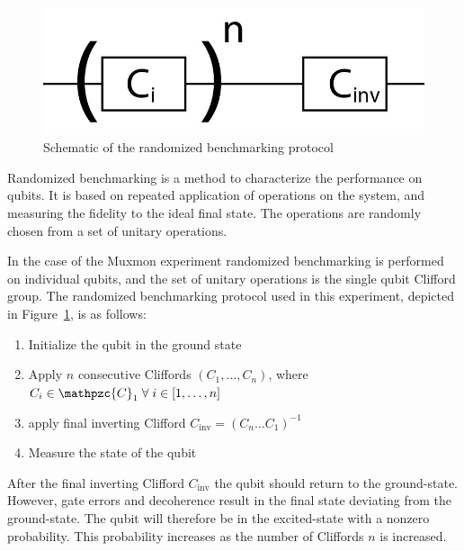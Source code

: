       \begin{figure}
        \begin{center}
        \vspace{-30pt}
          \includegraphics[width=.8\textwidth]{../Figures/Randomized benchmarking/RB schematic.jpg}
        \end{center}
        \vspace{-20 pt}
        \caption{Schematic of the randomized benchmarking protocol}
        \label{fig:RB schematic}
      \end{figure}

      Randomized benchmarking is a method to characterize the performance on qubits. It is based on repeated application of operations on the system, and measuring the fidelity to the ideal final state. The operations are randomly chosen from a set of unitary operations.

      In the case of the Muxmon experiment randomized benchmarking is performed on individual qubits, and the set of unitary operations is the single qubit Clifford group. The randomized benchmarking protocol used in this experiment, depicted in Figure~\ref{fig:RB schematic}, is as follows:

      \begin{enumerate}
        \item Initialize the qubit in the ground state
        \item Apply $n$ consecutive Cliffords $\left(C_1, \dots, C_n\right)$, where $C_i \in \mathpzc{C}_1 \; \forall \; i \in \left[1, \dots, n\right]$
        \item apply final inverting Clifford $C_\text{inv}=\left( C_n \dots C_1 \right)^{-1}$
        \item Measure the state of the qubit
      \end{enumerate}

      After the final inverting Clifford $C_\text{inv}$ the qubit should return to the ground-state. However, gate errors and decoherence result in the final state deviating from the ground-state. The qubit will therefore be in the excited-state with a nonzero probability. This probability increases as the number of Cliffords $n$ is increased.

